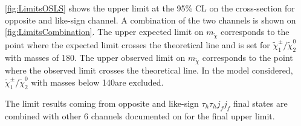  \autoref{fig:LimitsOSLS}  shows the upper limit at the 95\% CL on the cross-section for opposite and like-sign channel. A combination of the two channels is shown on \autoref{fig:LimitsCombination}. The upper expected limit on $m_{\tilde{\chi}}$ corresponds to the point where the expected limit crosses the theoretical line and is set for  $\tilde{\chi}_{1}^{\pm} /\tilde{\chi}_{2}^{0} $ with masses of 180\gev. The upper observed limit on $m_{\tilde{\chi}}$ corresponds to the point where the observed limit crosses the theoretical line. In the model considered, $\tilde{\chi}_{1}^{\pm} /\tilde{\chi}_{2}^{0} $ with masses below 140\gev are excluded.
 
The limit results coming from opposite and like-sign $\tau_{h}\tau_{h} j_{f} j_{f}$ final states are combined with other 6 channels documented on \cite{Khachatryan:2015kxa} for the final upper limit.

